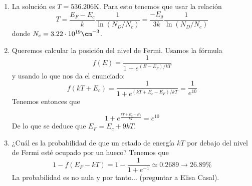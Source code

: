 	
	\begin{enumerate}[label=\alph*)]
		\item La solución es $T=536.206$K. Para esto tenemos que usar la relación
		\begin{equation}
			T = \frac{E_F-E_c}{k} \frac{1}{\ln (N_D/N_c)} =  \frac{-E_g}{3k} \frac{1}{\ln (N_D/N_c)}
		\end{equation}
		donde $N_c=3.22\cdot 10^{19}\cm^{-3}$.
		\item Queremos calcular la posición del nivel de Fermi. Usamos la fórmula
		\begin{equation}
			f(E) = \frac{1}{1+e^{(E-E_F)/kT}}
		\end{equation}
		y usando lo que nos da el enunciado:
		\begin{equation}
			f(kT+E_c) = \frac{1}{1+e^{(kT+E_c-E_F)/kT}}
			= \frac{1}{e^{10}}
		\end{equation}
		Tenemos entonces que

		\begin{equation}
			1+e^{\frac{kT+E_c-E_f}{kT}} = e^{10}
		\end{equation}
		De lo que se deduce que $E_F = E_c + 9kT$.
		\item ¿Cuál es la probabilidad de que un estado de energía \( kT \) por debajo del nivel de Fermi esté ocupado por un hueco? Tenemos que
		\begin{equation}
			1-f(E_F-kT) = 1 - \frac{1}{1+e^{-1}} \simeq 0.2689 \rightarrow 26.89 \%
		\end{equation}
		La probabilidad es no nula y por tanto... (preguntar a Elisa Casal).
	\end{enumerate}
